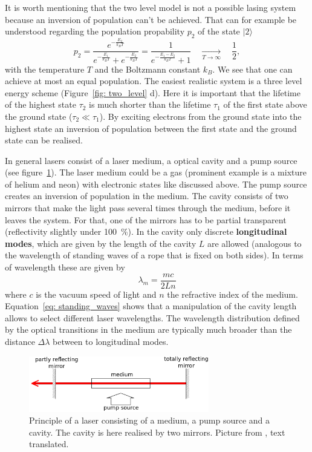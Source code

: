 It is worth mentioning that the two level model is not a possible lasing system because an inversion of population
can't be achieved. That can for example be understood
regarding the population propability $p_2$ of the state $|2\rangle$
\begin{equation}
  p_2 = \frac{e^{-\frac{E_2}{k_B T}}}{ e^{-\frac{E_1}{k_B T}} + e^{-\frac{E_2}{k_B T}} } =
  \frac{1}{ e^{-\frac{E_1 - E_2}{k_B T}} + 1}
    \quad \underset{T \rightarrow \infty}{\longrightarrow}\quad  \frac{1}{2},
\end{equation}
with the temperature $T$ and the Boltzmann constant $k_B$. We see that one can achieve at most an equal population. The easiest
realistic system is a three level energy scheme (Figure~\ref{fig: two_level} d). Here it is important that the lifetime of the highest state $\tau_2$ is much shorter
than the lifetime $\tau_1$ of the first state above the ground state ($\tau_2 \ll \tau_1$). By exciting electrons from the ground state into the highest
state an inversion of population between the first state and the ground state can be realised.

In general lasers consist of a laser medium, a optical cavity and a pump source (see figure~\ref{fig: principle_laser}).
The laser medium could be a gas (prominent example is a mixture of helium and neon) with electronic states like discussed above. The pump source
creates an inversion of population in the medium. The cavity consists of two mirrors that make the light pass several times through the medium, before
it leaves the system. For that, one of the mirrors has to be partial transparent (reflectivity slightly under \SI{100}{\percent}). In the
cavity only discrete \textbf{longitudinal modes}, which are given by the length of the cavity $L$ are allowed (analogous 
to the wavelength of standing waves of a rope that is fixed on both sides). In terms of wavelength these are
given by
\begin{equation}
  \lambda_m = \frac{m c}{2 L n}
  \label{eq: standing_waves}
\end{equation}
where $c$ is the vacuum speed of light and $n$ the refractive index of the medium. Equation~\eqref{eq: standing_waves} shows that a manipulation of the
cavity length allows to select different laser wavelengths. The wavelength distribution defined by the optical transitions in the medium 
are typically much broader than the distance $\Delta \lambda$ between to longitudinal modes. 

\begin{figure}
  \centering
  \includegraphics[width = 0.7\textwidth]{pics/prinzip_laser.png}
  \caption{Principle of a laser consisting of a medium, a pump source and a cavity. The cavity is here realised by two mirrors.
  Picture from \cite{anleitung61}, text translated.}
  \label{fig: principle_laser}
\end{figure}

